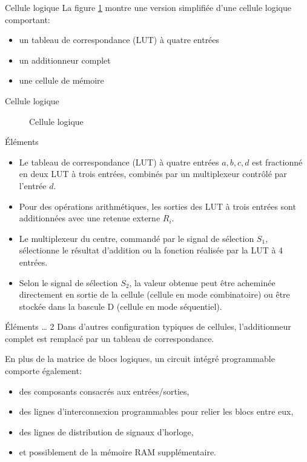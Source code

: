 \documentclass[presentation]{beamer}
\begin{document}
\begin{frame}[label={sec:org2aabd97}]{Cellule logique}
La figure \ref{fig:orga873c72} montre une version simplifiée d'une cellule logique comportant:
\begin{itemize}
\item un tableau de correspondance (LUT) à quatre entrées
\item un additionneur complet
\item une cellule de mémoire
\end{itemize}
\end{frame}

\begin{frame}[label={sec:orgd820358}]{Cellule logique}
\begin{figure}[htbp]
\centering

\caption{\label{fig:orga873c72}Cellule logique}
\end{figure}
\end{frame}

\begin{frame}[label={sec:orga73472c}]{Éléments}
\begin{itemize}
\item Le tableau de correspondance (LUT) à quatre entrées \(a, b, c, d\) est fractionné en deux LUT à trois entrées, combinés par un multiplexeur contrôlé par l'entrée \(d\).

\item Pour des opérations arithmétiques, les sorties des LUT à trois entrées sont additionnées avec une retenue externe \(R_i\).

\item Le multiplexeur du centre, commandé par le signal de sélection \(S_1\), sélectionne le résultat d'addition ou la fonction réalisée par la LUT à 4 entrées.

\item Selon le signal de sélection \(S_2\), la valeur obtenue peut être acheminée directement en sortie de la cellule (cellule en mode combinatoire) ou être stockée dans la bascule D (cellule en mode séquentiel).
\end{itemize}
\end{frame}

\begin{frame}[label={sec:orgb6b78f5}]{Éléments \ldots{} 2}
Dans d'autres configuration typiques de cellules, l'additionneur complet est remplacé par un tableau de correspondance.

En plus de la matrice de blocs logiques, un circuit intégré programmable comporte également:
\begin{itemize}
\item des composants consacrés aux entrées/sorties,
\item des lignes d'interconnexion programmables pour relier les blocs entre eux,
\item des lignes de distribution de signaux d'horloge,
\item et possiblement de la mémoire RAM supplémentaire.
\end{itemize}
\end{frame}
\end{document}
